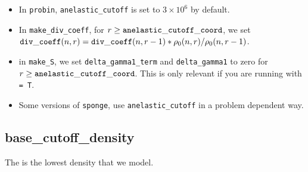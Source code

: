 \begin{itemize}

\item In {\tt probin}, {\tt anelastic\_cutoff} is set to $3\times 10^6$ by default.

\item In {\tt make\_div\_coeff}, for 
  $r \ge {\tt anelastic\_cutoff\_coord}$, we set
  ${\tt div\_coeff}(n,r) = {\tt div\_coeff}(n,r-1) * \rho_0(n,r)/\rho_0(n,r-1)$.

\item in {\tt make\_S}, we set {\tt delta\_gamma1\_term} and {\tt delta\_gamma1} 
  to zero for $r \ge {\tt anelastic\_cutoff\_coord}$.  This is only relevant
  if you are running with  {\tt = T}.

\item Some versions of {\tt sponge}, use {\tt anelastic\_cutoff} in a problem dependent way.

\end{itemize}

\subsection{base\_cutoff\_density}\label{Sec:Base Cutoff Density}

The  is the lowest density that we model.

